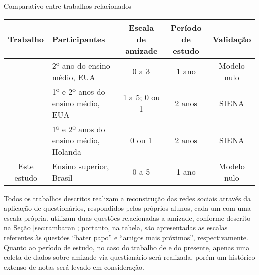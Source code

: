 \begin{quadro}[ht]
    \caption{Comparativo entre trabalhos relacionados}
    \label{board:related}
    \fontsize{10}{12}\selectfont
    \def\arraystretch{1.25}
    \begin{tabularx}{\textwidth}{|c|Y|c|c|c|}
        \hline
        \textbf{Trabalho} & \textbf{Participantes} & \textbf{Escala de amizade} & \textbf{Período de estudo} & \textbf{Validação}
        \\ \hline
         & 2º ano do ensino médio, EUA & 0 a 3 & 1 ano & Modelo nulo
        \\ \hline
         & 1º e 2º anos do ensino médio, EUA & 1 a 5; 0 ou 1 & 2 anos & SIENA
        \\ \hline
         & 1º e 2º anos do ensino médio, Holanda & 0 ou 1 & 2 anos & SIENA
        \\ \hline
        Este estudo & Ensino superior, Brasil & 0 a 5 & 1 ano & Modelo nulo
        \\ \hline
    \end{tabularx}
\end{quadro}

Todos os trabalhos descritos realizam a reconstrução das redes sociais através da aplicação de questionários, respondidos pelos próprios alunos, cada um com uma escala própria.  utilizam duas questões relacionadas a amizade, conforme descrito na Seção \ref{sec:rambaran}; portanto, na tabela, são apresentadas as escalas referentes às questões ``bater papo'' e ``amigos mais próximos'', respectivamente. Quanto ao período de estudo, no caso do trabalho de  e do presente, apenas uma coleta de dados sobre amizade via questionário será realizada, porém um histórico extenso de notas será levado em consideração.